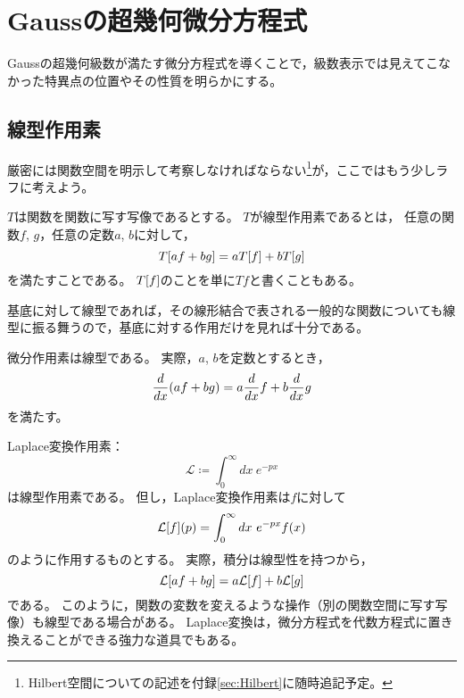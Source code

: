 \documentclass[a4paper,draft]{ltjsarticle}
\begin{document}
\section{Gaussの超幾何微分方程式}
Gaussの超幾何級数が満たす微分方程式を導くことで，級数表示では見えてこなかった特異点の位置やその性質を明らかにする。

\subsection{線型作用素}
厳密には関数空間を明示して考察しなければならない\footnote{Hilbert空間についての記述を付録\ref{sec:Hilbert}に随時追記予定。}が，ここではもう少しラフに考えよう。

\begin{defi}[線型作用素]
    $T$は関数を関数に写す写像であるとする。
    $T$が線型作用素であるとは，
    任意の関数$f$, $g$，任意の定数$a$, $b$に対して，
    \begin{equation}
        T\squ{af+bg}=aT\squ{f}+bT\squ{g}
    \end{equation}
    を満たすことである。
    $T\squ{f}$のことを単に$Tf$と書くこともある。
\end{defi}

基底に対して線型であれば，その線形結合で表される一般的な関数についても線型に振る舞うので，基底に対する作用だけを見れば十分である。

\begin{eg}
    微分作用素は線型である。
    実際，$a$, $b$を定数とするとき，
    \begin{equation}
        \diff{}{x}\pare{af+bg}=a\diff{}{x}f+b\diff{}{x}g
    \end{equation}
    を満たす。
\end{eg}

\begin{eg}
    Laplace変換作用素：
    \begin{equation}
        \mathcal{L}\coloneqq \int_0^\infty dx\ e^{-px}
    \end{equation}
    は線型作用素である。
    但し，Laplace変換作用素は$f$に対して
    \begin{equation}
        \Laplace{f}(p)=\int_0^\infty dx\ e^{-px}\fun{f}{x}
    \end{equation}
    のように作用するものとする。
    実際，積分は線型性を持つから，
    \begin{equation}
        \Laplace{af+bg}=a\Laplace{f}+b\Laplace{g}
    \end{equation}
    である。
    このように，関数の変数を変えるような操作（別の関数空間に写す写像）も線型である場合がある。
    Laplace変換は，微分方程式を代数方程式に置き換えることができる強力な道具でもある。
\end{eg}
\end{document}
